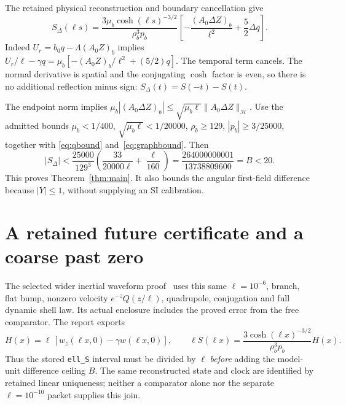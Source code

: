 \documentclass[10pt]{article}
\newcommand{\Hh}{\mathcal H}
\newcommand{\dd}{\Delta}
\newcommand{\norm}[1]{\lVert#1\rVert}
\begin{document}
The retained physical reconstruction and boundary cancellation give
\begin{equation}\label{eq:physical}
 S_{\dd}(\ell s)=\frac{3\mu_b\cosh(\ell s)^{-3/2}}{\rho_b^3p_b}
 \left[-\frac{(A_0\dd Z)_b}{\ell^2}+\frac52\dd q\right].
\end{equation}
Indeed \(U_r=b_0q-\Lambda(A_0Z)_b\) implies
\(U_r/\ell-\gamma q=\mu_b[-(A_0Z)_b/\ell^2+(5/2)q]\).
The temporal term cancels. The normal derivative is spatial and the
conjugating \(\cosh\) factor is even, so there is no additional reflection
minus sign: \(S_\dd(t)=S(-t)-S(t)\).

The endpoint norm implies
\(\mu_b|(A_0\dd Z)_b|\le\sqrt{\mu_b\ell}\norm{A_0\dd Z}_{\Hh}\).
Use the admitted bounds
\(\mu_b<1/400\), \(\sqrt{\mu_b\ell}<1/20000\),
\(\rho_b\ge129\), \(|p_b|\ge3/25000\), together with
\eqref{eq:qbound} and~\eqref{eq:graphbound}. Then
\begin{equation}\label{eq:ceiling}
 |S_\dd|<\frac{25000}{129^3}
 \left(\frac{33}{20000\ell}+\frac{\ell}{160}\right)
 =\frac{264000000001}{13738809600}=B<20.
\end{equation}
This proves Theorem~\ref{thm:main}. It also bounds the angular first-field
difference because \(|Y|\le1\), without supplying an SI calibration.

\section{A retained future certificate and a coarse past zero}

The selected wider inertial waveform proof~\cite{future} uses this same
\(\ell=10^{-6}\), branch, flat bump, nonzero velocity \(e^{-z}Q(z/\ell)\),
quadrupole, conjugation and full dynamic shell law. Its actual enclosure
includes the proved error from the free comparator. The report exports
\begin{equation}\label{eq:export}
 H(x)=\ell\,[w_z(\ell x,0)-\gamma w(\ell x,0)],\qquad
 \ell S(\ell x)=\frac{3\cosh(\ell x)^{-3/2}}{\rho_b^3p_b}H(x).
\end{equation}
Thus the stored \texttt{ell\_S} interval must be divided by \(\ell\)
\emph{before} adding the model-unit difference ceiling \(B\).
The same reconstructed state and clock are identified by retained linear
uniqueness; neither a comparator alone nor the separate \(\ell=10^{-10}\)
packet supplies this join.
\end{document}
